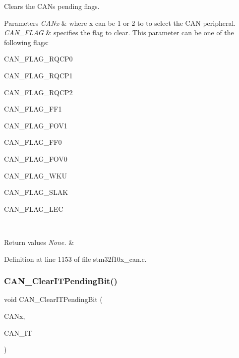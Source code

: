 Clears the C\+AN\textquotesingle{}s pending flags. 


\begin{DoxyParams}{Parameters}
{\em C\+A\+Nx} & where x can be 1 or 2 to to select the C\+AN peripheral. \\
\hline
{\em C\+A\+N\+\_\+\+F\+L\+AG} & specifies the flag to clear. This parameter can be one of the following flags\+:
\begin{DoxyItemize}
\item C\+A\+N\+\_\+\+F\+L\+A\+G\+\_\+\+R\+Q\+C\+P0
\item C\+A\+N\+\_\+\+F\+L\+A\+G\+\_\+\+R\+Q\+C\+P1
\item C\+A\+N\+\_\+\+F\+L\+A\+G\+\_\+\+R\+Q\+C\+P2
\item C\+A\+N\+\_\+\+F\+L\+A\+G\+\_\+\+F\+F1
\item C\+A\+N\+\_\+\+F\+L\+A\+G\+\_\+\+F\+O\+V1
\item C\+A\+N\+\_\+\+F\+L\+A\+G\+\_\+\+F\+F0
\item C\+A\+N\+\_\+\+F\+L\+A\+G\+\_\+\+F\+O\+V0
\item C\+A\+N\+\_\+\+F\+L\+A\+G\+\_\+\+W\+KU
\item C\+A\+N\+\_\+\+F\+L\+A\+G\+\_\+\+S\+L\+AK
\item C\+A\+N\+\_\+\+F\+L\+A\+G\+\_\+\+L\+EC 
\end{DoxyItemize}\\
\hline
\end{DoxyParams}

\begin{DoxyRetVals}{Return values}
{\em None.} & \\
\hline
\end{DoxyRetVals}


Definition at line 1153 of file stm32f10x\+\_\+can.\+c.

\mbox{\label{group___c_a_n___private___functions_ga30bf7ac0c1793f6622a4a1adbb7dbc8a}} 
\subsubsection{\texorpdfstring{C\+A\+N\+\_\+\+Clear\+I\+T\+Pending\+Bit()}{CAN\_ClearITPendingBit()}}
{\footnotesize\ttfamily void C\+A\+N\+\_\+\+Clear\+I\+T\+Pending\+Bit (\begin{DoxyParamCaption}\item[{\hyperlink{struct_c_a_n___type_def}{C\+A\+N\+\_\+\+Type\+Def} $\ast$}]{C\+A\+Nx,  }\item[{uint32\+\_\+t}]{C\+A\+N\+\_\+\+IT }\end{DoxyParamCaption})}




